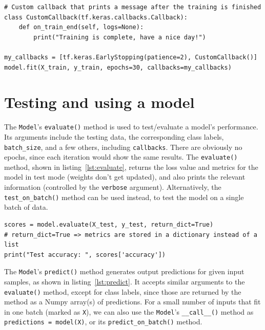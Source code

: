 \begin{lstlisting}[caption={A class for a custom callback, and training a Keras model using its \texttt{fit()} method while
utilizing multiple callbacks, including the custom one.}, label={lst:callbacks}]
# Custom callback that prints a message after the training is finished
class CustomCallback(tf.keras.callbacks.Callback):
    def on_train_end(self, logs=None):
        print("Training is complete, have a nice day!")

my_callbacks = [tf.keras.EarlyStopping(patience=2), CustomCallback()]
model.fit(X_train, y_train, epochs=30, callbacks=my_callbacks)
\end{lstlisting}



\section{Testing and using a model}
\label{testing-and-using-a-model}
The \texttt{Model}'s \texttt{evaluate()} method is used to test/evaluate a model's performance.
Its arguments include the testing data, the corresponding class labels, \texttt{batch\_size}, and a few
others, including \texttt{callbacks}. There are obviously no epochs, since each iteration would show the same
results. The \texttt{evaluate()} method, shown in listing~\ref{lst:evaluate}, returns the loss value and metrics
for the model in test mode (weights don't get updated), and also prints the relevant information
(controlled by the \texttt{verbose} argument).
Alternatively, the \texttt{test\_on\_batch()} method can be used instead, to test the model on a single batch of data.

\begin{lstlisting}[caption={Evaluating a model's accuracy on a testing dataset.}, label={lst:evaluate}]
scores = model.evaluate(X_test, y_test, return_dict=True)
# return_dict=True => metrics are stored in a dictionary instead of a list
print("Test accuracy: ", scores['accuracy'])
\end{lstlisting}

The \texttt{Model}'s \texttt{predict()} method generates output predictions for given input samples,
as shown in listing~\ref{lst:predict}.
It accepts similar arguments to the \texttt{evaluate()} method, except for class labels,
since those are returned by the method as a Numpy array(s) of predictions.
For a small number of inputs that fit in one batch (marked as \texttt{X}), we can also use the \texttt{Model}'s
\texttt{\_\_call\_\_()} method as \texttt{predictions = model(X)}, or its \texttt{predict\_on\_batch()} method.

